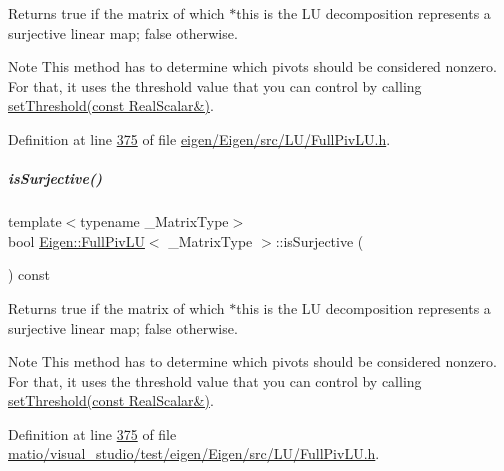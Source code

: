 \begin{DoxyReturn}{Returns}
true if the matrix of which $\ast$this is the LU decomposition represents a surjective linear map; false otherwise.
\end{DoxyReturn}
\begin{DoxyNote}{Note}
This method has to determine which pivots should be considered nonzero. For that, it uses the threshold value that you can control by calling \hyperlink{group___l_u___module_a414592d82de98f5bd075965caf56d681}{set\+Threshold(const Real\+Scalar\&)}. 
\end{DoxyNote}


Definition at line \hyperlink{eigen_2_eigen_2src_2_l_u_2_full_piv_l_u_8h_source_l00375}{375} of file \hyperlink{eigen_2_eigen_2src_2_l_u_2_full_piv_l_u_8h_source}{eigen/\+Eigen/src/\+L\+U/\+Full\+Piv\+L\+U.\+h}.

\mbox{\label{group___l_u___module_a1f6222875fc3a181ee1544b9b36dfda5}} 
\subparagraph{\texorpdfstring{is\+Surjective()}{isSurjective()}\hspace{0.1cm}{\footnotesize\ttfamily [2/2]}}
{\footnotesize\ttfamily template$<$typename \+\_\+\+Matrix\+Type$>$ \\
bool \hyperlink{group___l_u___module_class_eigen_1_1_full_piv_l_u}{Eigen\+::\+Full\+Piv\+LU}$<$ \+\_\+\+Matrix\+Type $>$\+::is\+Surjective (\begin{DoxyParamCaption}{ }\end{DoxyParamCaption}) const\hspace{0.3cm}{\ttfamily [inline]}}

\begin{DoxyReturn}{Returns}
true if the matrix of which $\ast$this is the LU decomposition represents a surjective linear map; false otherwise.
\end{DoxyReturn}
\begin{DoxyNote}{Note}
This method has to determine which pivots should be considered nonzero. For that, it uses the threshold value that you can control by calling \hyperlink{group___l_u___module_a414592d82de98f5bd075965caf56d681}{set\+Threshold(const Real\+Scalar\&)}. 
\end{DoxyNote}


Definition at line \hyperlink{matio_2visual__studio_2test_2eigen_2_eigen_2src_2_l_u_2_full_piv_l_u_8h_source_l00375}{375} of file \hyperlink{matio_2visual__studio_2test_2eigen_2_eigen_2src_2_l_u_2_full_piv_l_u_8h_source}{matio/visual\+\_\+studio/test/eigen/\+Eigen/src/\+L\+U/\+Full\+Piv\+L\+U.\+h}.

